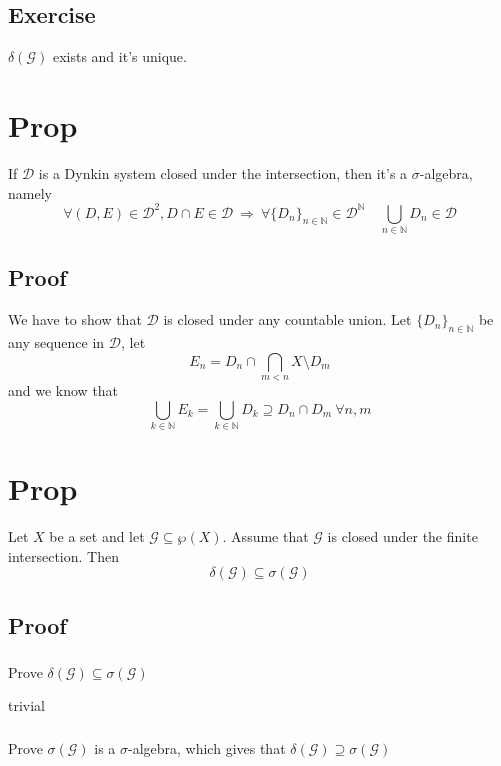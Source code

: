 \documentclass{book}
\begin{document}
\subsection*{Exercise}$\delta(\mathcal{G})$ exists and it's unique.
\section{Prop}
If $\mathscr{D}$ is a Dynkin system closed under the intersection, then it's a $\sigma$-algebra, namely
$$\forall(D,E)\in \mathscr{D}^2, D\cap E\in \mathscr{D}\ \Rightarrow\ \forall\{D_n\}_{n\in \mathbb{N}}\in \mathscr{D}^\mathbb{N}\quad \bigcup\limits_{n\in \mathbb{N}}D_n\in \mathscr{D}$$
\subsection*{Proof}
We have to show that $\mathscr{D}$ is closed under any countable union. Let $\{D_n\}_{n\in \mathbb{N}}$ be any sequence in $\mathscr{D}$, let
$$E_n=D_n\cap\bigcap\limits_{m<n}X\setminus D_m$$
and we know that 
$$\bigcup\limits_{k\in \mathbb{N}}E_k=\bigcup\limits_{k\in \mathbb{N}}D_k\supseteq D_n\cap D_m\ \forall n,m$$
\section{Prop}
\label{Prop 53.7}
Let $X$ be a set and let $\mathcal{G}\subseteq\wp(X)$. Assume that $\mathcal{G}$ is closed under the finite intersection. Then $$\delta(\mathcal{G})\subseteq\sigma(\mathcal{G})$$
\subsection*{Proof}
\subsubsection{}
Prove $\delta(\mathcal{G})\subseteq\sigma(\mathcal{G})$

trivial
\subsubsection{}
Prove $\sigma(\mathcal{G})$ is a $\sigma$-algebra, which gives that $\delta(\mathcal{G})\supseteq\sigma(\mathcal{G})$
\end{document}
